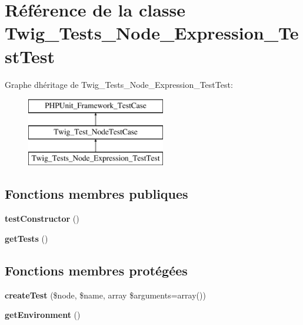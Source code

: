 \hypertarget{class_twig___tests___node___expression___test_test}{}\section{Référence de la classe Twig\+\_\+\+Tests\+\_\+\+Node\+\_\+\+Expression\+\_\+\+Test\+Test}
\label{class_twig___tests___node___expression___test_test}
Graphe d\textquotesingle{}héritage de Twig\+\_\+\+Tests\+\_\+\+Node\+\_\+\+Expression\+\_\+\+Test\+Test\+:\begin{figure}[H]
\begin{center}
\leavevmode
\includegraphics[height=3.000000cm]{class_twig___tests___node___expression___test_test}
\end{center}
\end{figure}
\subsection*{Fonctions membres publiques}
\begin{DoxyCompactItemize}
\item 
{\bfseries test\+Constructor} ()\hypertarget{class_twig___tests___node___expression___test_test_a47094dc941e72950570900d1418f89c6}{}\label{class_twig___tests___node___expression___test_test_a47094dc941e72950570900d1418f89c6}

\item 
{\bfseries get\+Tests} ()\hypertarget{class_twig___tests___node___expression___test_test_a7e247dd31cc8d37a6c97353a062a0080}{}\label{class_twig___tests___node___expression___test_test_a7e247dd31cc8d37a6c97353a062a0080}

\end{DoxyCompactItemize}
\subsection*{Fonctions membres protégées}
\begin{DoxyCompactItemize}
\item 
{\bfseries create\+Test} (\$node, \$name, array \$arguments=array())\hypertarget{class_twig___tests___node___expression___test_test_a2a2a1551ad575b2081eff2971ca065a3}{}\label{class_twig___tests___node___expression___test_test_a2a2a1551ad575b2081eff2971ca065a3}

\item 
{\bfseries get\+Environment} ()\hypertarget{class_twig___tests___node___expression___test_test_a1a945689f9a90f9029d671ec32262d37}{}\label{class_twig___tests___node___expression___test_test_a1a945689f9a90f9029d671ec32262d37}

\end{DoxyCompactItemize}


